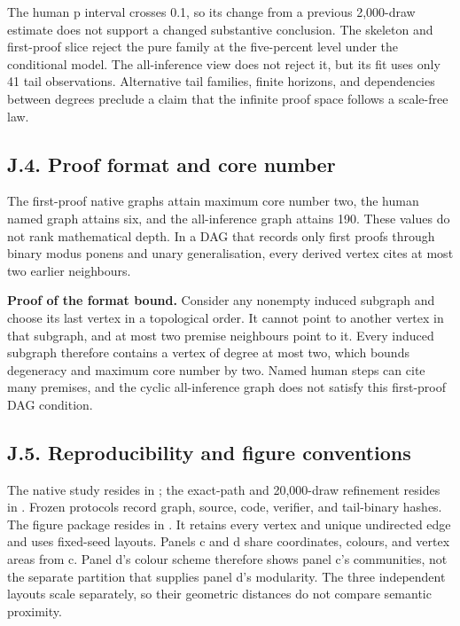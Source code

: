 \documentclass[pdflatex,sn-basic,Numbered]{sn-jnl}
\begin{document}
\endgroup

The human p interval crosses 0.1, so its change from a previous 2,000-draw estimate does not support a changed substantive conclusion. The skeleton and first-proof slice reject the pure family at the five-percent level under the conditional model. The all-inference view does not reject it, but its fit uses only 41 tail observations. Alternative tail families, finite horizons, and dependencies between degrees preclude a claim that the infinite proof space follows a scale-free law.

\subsection*{J.4. Proof format and core number}\label{j.4.-proof-format-and-core-number}

The first-proof native graphs attain maximum core number two, the human named graph attains six, and the all-inference graph attains 190. These values do not rank mathematical depth. In a DAG that records only first proofs through binary modus ponens and unary generalisation, every derived vertex cites at most two earlier neighbours.

\textbf{Proof of the format bound.} Consider any nonempty induced subgraph and choose its last vertex in a topological order. It cannot point to another vertex in that subgraph, and at most two premise neighbours point to it. Every induced subgraph therefore contains a vertex of degree at most two, which bounds degeneracy and maximum core number by two. Named human steps can cite many premises, and the cyclic all-inference graph does not satisfy this first-proof DAG condition.

\subsection*{J.5. Reproducibility and figure conventions}\label{j.5.-reproducibility-and-figure-conventions}

The native study resides in ; the exact-path and 20,000-draw refinement resides in . Frozen protocols record graph, source, code, verifier, and tail-binary hashes. The figure package resides in . It retains every vertex and unique undirected edge and uses fixed-seed layouts. Panels c and d share coordinates, colours, and vertex areas from c. Panel d's colour scheme therefore shows panel c's communities, not the separate partition that supplies panel d's modularity. The three independent layouts scale separately, so their geometric distances do not compare semantic proximity.
\end{document}
